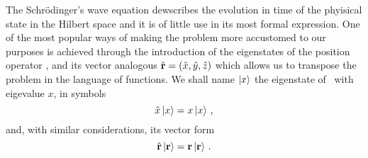         The Schr\"odinger's wave equation dewscribes the evolution in time of the phyisical state in the Hilbert space and it is of little use in its most formal expression. One of the most popular ways of making the problem more accustomed to our purposes is achieved through the introduction of the eigenstates of the position operator \hx, and its vector analogous $\hvr = \pqty{\hx,\hy,\hz}$ which allows us to transpose the problem in the language of functions. We shall name $\ket{x}$ the eigenstate of \hx\ with eigevalue $x$, in symbols
        \begin{equation}
            \label{eq:x-eigenvalues}
            \hat{x}\ket{x} = x\ket{x}
            \,\text{,}
        \end{equation}
        and, with similar considerations, its vector form
        \begin{equation}
            \label{eq:r-eigenvalues}
            \hat{\vb{r}}\ket{\vb{r}} = \vb{r}\ket{\vb{r}}
            \,\text{.}
        \end{equation}

